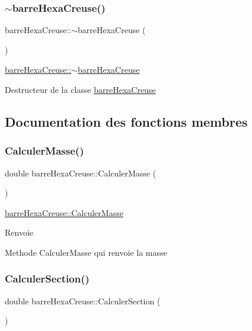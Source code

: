 \subsubsection{\texorpdfstring{$\sim$barre\+Hexa\+Creuse()}{~barreHexaCreuse()}}
{\footnotesize\ttfamily barre\+Hexa\+Creuse\+::$\sim$barre\+Hexa\+Creuse (\begin{DoxyParamCaption}{ }\end{DoxyParamCaption})}



\hyperlink{classbarre_hexa_creuse_a5b51540579b5268f23dbcf8e5db04458}{barre\+Hexa\+Creuse\+::$\sim$barre\+Hexa\+Creuse} 

Destructeur de la classe \hyperlink{classbarre_hexa_creuse}{barre\+Hexa\+Creuse} 

\subsection{Documentation des fonctions membres}
\mbox{\label{classbarre_hexa_creuse_a0d524ad6862407dc9128c7163b22a0ca}} 
\subsubsection{\texorpdfstring{Calculer\+Masse()}{CalculerMasse()}}
{\footnotesize\ttfamily double barre\+Hexa\+Creuse\+::\+Calculer\+Masse (\begin{DoxyParamCaption}{ }\end{DoxyParamCaption})}



\hyperlink{classbarre_hexa_creuse_a0d524ad6862407dc9128c7163b22a0ca}{barre\+Hexa\+Creuse\+::\+Calculer\+Masse} 

\begin{DoxyReturn}{Renvoie}

\end{DoxyReturn}
Methode Calculer\+Masse qui renvoie la masse \mbox{\label{classbarre_hexa_creuse_a205ab8a47da16cd0eb63770bcd911b90}} 
\subsubsection{\texorpdfstring{Calculer\+Section()}{CalculerSection()}}
{\footnotesize\ttfamily double barre\+Hexa\+Creuse\+::\+Calculer\+Section (\begin{DoxyParamCaption}{ }\end{DoxyParamCaption})}



